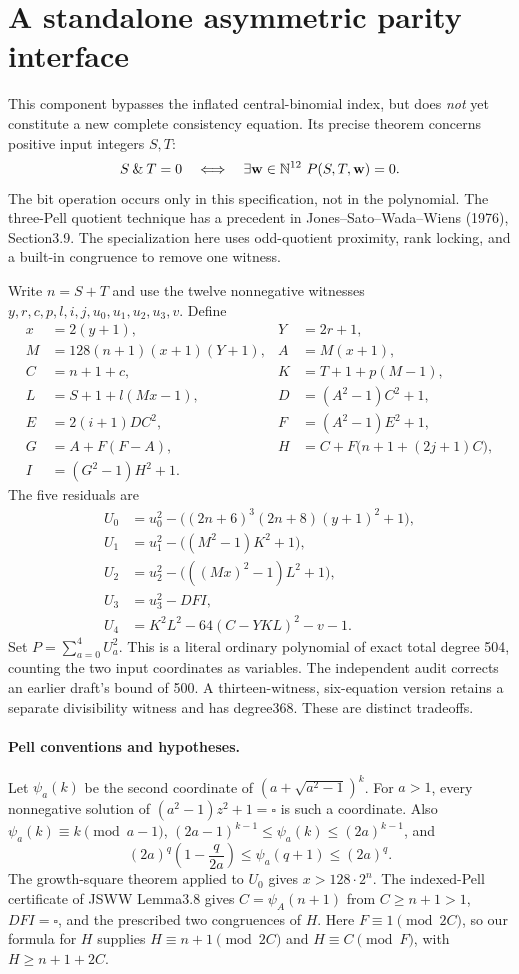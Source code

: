\section{A standalone asymmetric parity interface}
\label{sec:parity}
This component bypasses the inflated central-binomial index, but does
\emph{not} yet constitute a new complete consistency equation. Its
precise theorem concerns positive input integers $S,T$:
\[
 S\mathbin{\&}T=0\quad\Longleftrightarrow\quad
 \exists\mathbf w\in\mathbb N^{12}\ P(S,T,\mathbf w)=0.
\]
The bit operation occurs only in this specification, not in the polynomial.
The three-Pell quotient technique has a precedent in Jones--Sato--Wada--Wiens
(1976), Section3.9. The specialization here uses odd-quotient proximity,
rank locking, and a built-in congruence to remove one witness.

Write $n=S+T$ and use the twelve nonnegative witnesses
$y,r,c,p,l,i,j,u_0,u_1,u_2,u_3,v$. Define
\begin{align*}
 x&=2(y+1),&Y&=2r+1,\\
 M&=128(n+1)(x+1)(Y+1),&A&=M(x+1),\\
 C&=n+1+c,&K&=T+1+p(M-1),\\
 L&=S+1+l(Mx-1),&D&=(A^2-1)C^2+1,\\
 E&=2(i+1)DC^2,&F&=(A^2-1)E^2+1,\\
 G&=A+F(F-A),&H&=C+F\bigl(n+1+(2j+1)C\bigr),\\
 I&=(G^2-1)H^2+1.&&
\end{align*}
The five residuals are
\begin{align*}
 U_0&=u_0^2-\bigl((2n+6)^3(2n+8)(y+1)^2+1\bigr),\\
 U_1&=u_1^2-\bigl((M^2-1)K^2+1\bigr),\\
 U_2&=u_2^2-\bigl(((Mx)^2-1)L^2+1\bigr),\\
 U_3&=u_3^2-DFI,\\
 U_4&=K^2L^2-64(C-YKL)^2-v-1.
\end{align*}
Set $P=\sum_{a=0}^4U_a^2$. This is a literal ordinary polynomial of
exact total degree 504, counting the two input coordinates as variables.
The independent audit corrects an earlier draft's bound of 500.
A thirteen-witness, six-equation version retains a separate divisibility
witness and has degree368. These are distinct tradeoffs.

\paragraph{Pell conventions and hypotheses.}
Let $\psi_a(k)$ be the second coordinate of
$(a+\sqrt{a^2-1})^k$. For $a>1$, every nonnegative solution of
$(a^2-1)z^2+1=\square$ is such a coordinate. Also
$\psi_a(k)\equiv k\pmod{a-1}$,
$(2a-1)^{k-1}\le\psi_a(k)\le(2a)^{k-1}$, and
\[
 (2a)^q\left(1-\frac{q}{2a}\right)
 \le\psi_a(q+1)\le(2a)^q.
\]
The growth-square theorem applied to $U_0$ gives $x>128\cdot2^n$.
The indexed-Pell certificate of JSWW Lemma3.8 gives
$C=\psi_A(n+1)$ from $C\ge n+1>1$, $DFI=\square$, and the
prescribed two congruences of $H$. Here $F\equiv1\pmod{2C}$, so
our formula for $H$ supplies $H\equiv n+1\pmod{2C}$ and
$H\equiv C\pmod F$, with $H\ge n+1+2C$.

